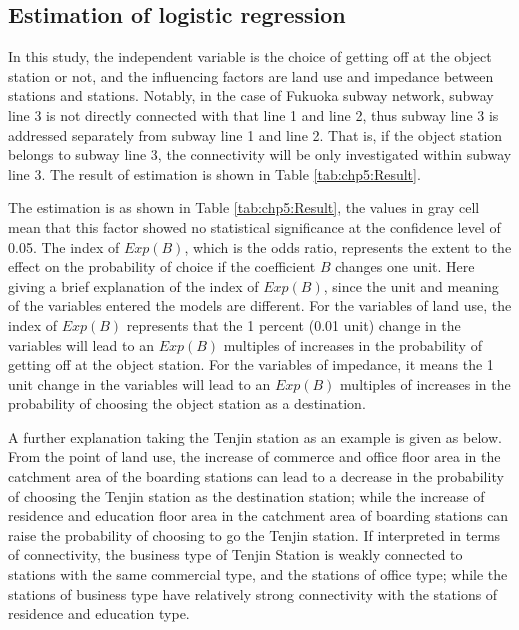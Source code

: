 \subsection{Estimation of logistic regression}
%
In this study, the independent variable is the choice of getting off at the object station or not, and the influencing factors are land use and impedance between stations and stations. Notably, in the case of Fukuoka subway network, subway line 3 is not directly connected with that line 1 and line 2, thus subway line 3 is addressed separately from subway line 1 and line 2. That is, if the object station belongs to subway line 3, the connectivity will be only investigated within subway line 3. The result of estimation is shown in Table \ref{tab:chp5:Result}.

%
The estimation is as shown in Table \ref{tab:chp5:Result}, the values in gray cell mean that this factor showed no statistical significance at the confidence level of 0.05. The index of $Exp(B)$, which is the odds ratio, represents the extent to the effect on the probability of choice if the coefficient $B$ changes one unit. Here giving a brief explanation of the index of $Exp(B)$, since the unit and meaning of the variables entered the models are different. For the variables of land use, the index of $Exp(B)$ represents that the 1 percent (0.01 unit) change in the variables will lead to an $Exp(B)$ multiples of increases in the probability of getting off at the object station. For the variables of impedance, it means the 1 unit change in the variables will lead to an $Exp(B)$ multiples of increases in the probability of choosing the object station as a destination. 

%
A further explanation taking the Tenjin station as an example is given as below. From the point of land use, the increase of commerce and office floor area in the catchment area of the boarding stations can lead to a decrease in the probability of choosing the Tenjin station as the destination station; while the increase of residence and education floor area in the catchment area of boarding stations can raise the probability of choosing to go the Tenjin station. If interpreted in terms of connectivity, the business type of Tenjin Station is weakly connected to stations with the same commercial type, and the stations of office type; while the stations of business type have relatively strong connectivity with the stations of residence and education type. 

%
